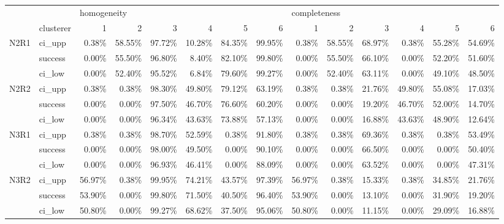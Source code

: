 \begin{tabular}{llrrrrrrrrrrrr}
\toprule
     & {} & \multicolumn{6}{l}{homogeneity} & \multicolumn{6}{l}{completeness} \\
     & clusterer &           1 &      2 &      3 &      4 &      5 &      6 &            1 &      2 &      3 &      4 &      5 &      6 \\
\midrule
N2R1 & ci\_upp &       0.38\% & 58.55\% & 97.72\% & 10.28\% & 84.35\% & 99.95\% &        0.38\% & 58.55\% & 68.97\% &  0.38\% & 55.28\% & 54.69\% \\
     & success &       0.00\% & 55.50\% & 96.80\% &  8.40\% & 82.10\% & 99.80\% &        0.00\% & 55.50\% & 66.10\% &  0.00\% & 52.20\% & 51.60\% \\
     & ci\_low &       0.00\% & 52.40\% & 95.52\% &  6.84\% & 79.60\% & 99.27\% &        0.00\% & 52.40\% & 63.11\% &  0.00\% & 49.10\% & 48.50\% \\
N2R2 & ci\_upp &       0.38\% &  0.38\% & 98.30\% & 49.80\% & 79.12\% & 63.19\% &        0.38\% &  0.38\% & 21.76\% & 49.80\% & 55.08\% & 17.03\% \\
     & success &       0.00\% &  0.00\% & 97.50\% & 46.70\% & 76.60\% & 60.20\% &        0.00\% &  0.00\% & 19.20\% & 46.70\% & 52.00\% & 14.70\% \\
     & ci\_low &       0.00\% &  0.00\% & 96.34\% & 43.63\% & 73.88\% & 57.13\% &        0.00\% &  0.00\% & 16.88\% & 43.63\% & 48.90\% & 12.64\% \\
N3R1 & ci\_upp &       0.38\% &  0.38\% & 98.70\% & 52.59\% &  0.38\% & 91.80\% &        0.38\% &  0.38\% & 69.36\% &  0.38\% &  0.38\% & 53.49\% \\
     & success &       0.00\% &  0.00\% & 98.00\% & 49.50\% &  0.00\% & 90.10\% &        0.00\% &  0.00\% & 66.50\% &  0.00\% &  0.00\% & 50.40\% \\
     & ci\_low &       0.00\% &  0.00\% & 96.93\% & 46.41\% &  0.00\% & 88.09\% &        0.00\% &  0.00\% & 63.52\% &  0.00\% &  0.00\% & 47.31\% \\
N3R2 & ci\_upp &      56.97\% &  0.38\% & 99.95\% & 74.21\% & 43.57\% & 97.39\% &       56.97\% &  0.38\% & 15.33\% &  0.38\% & 34.85\% & 21.76\% \\
     & success &      53.90\% &  0.00\% & 99.80\% & 71.50\% & 40.50\% & 96.40\% &       53.90\% &  0.00\% & 13.10\% &  0.00\% & 31.90\% & 19.20\% \\
     & ci\_low &      50.80\% &  0.00\% & 99.27\% & 68.62\% & 37.50\% & 95.06\% &       50.80\% &  0.00\% & 11.15\% &  0.00\% & 29.09\% & 16.88\% \\

\end{tabular}
